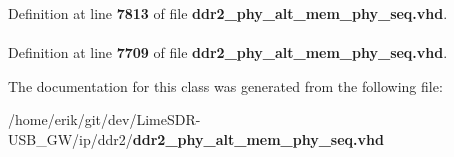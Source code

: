 Definition at line {\bf 7813} of file {\bf ddr2\+\_\+phy\+\_\+alt\+\_\+mem\+\_\+phy\+\_\+seq.\+vhd}.

\paragraph[{work}]{\hspace{0.3cm}{\ttfamily [Library]}}\label{classddr2__phy__alt__mem__phy__dgrb_a9f49de6f5eed5b4488cba6c9cdd1c215}


Definition at line {\bf 7709} of file {\bf ddr2\+\_\+phy\+\_\+alt\+\_\+mem\+\_\+phy\+\_\+seq.\+vhd}.



The documentation for this class was generated from the following file\+:\begin{DoxyCompactItemize}
\item 
/home/erik/git/dev/\+Lime\+S\+D\+R-\/\+U\+S\+B\+\_\+\+G\+W/ip/ddr2/{\bf ddr2\+\_\+phy\+\_\+alt\+\_\+mem\+\_\+phy\+\_\+seq.\+vhd}\end{DoxyCompactItemize}
